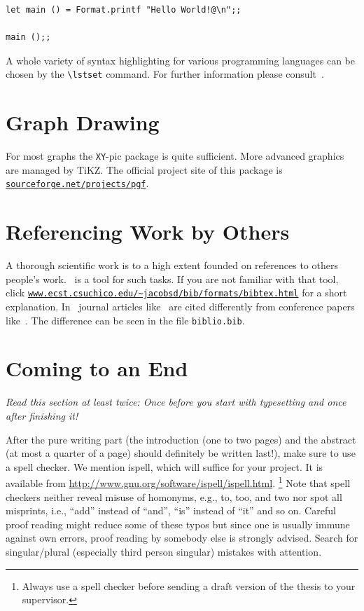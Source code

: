 \documentclass{howto}
\begin{document}
\lstset{label=LIS:hello world}
\begin{table}[tb]
\begin{lstlisting}
let main () = Format.printf "Hello World!@\n";;

main ();;
\end{lstlisting}
\end{table}
A whole variety of syntax highlighting for various programming languages
can be chosen by the \verb'\lstset' command. For further information please
consult~\cite{LIS}.

\section{Graph Drawing}
\label{GRA:main}
For most graphs the \texttt{XY}-pic package \cite{XY} is quite sufficient.
More advanced graphics are managed by TiKZ. The official project site of
this package is
\href{http://sourceforge.net/projects/pgf}%
 {\texttt{sourceforge.net/projects/pgf}}.

\section{Referencing Work by Others}
\label{REF:main}
A thorough scientific work is to a high extent founded on references to
others people's work. \BibTeX\ is a tool for such tasks. If
you are not familiar with that tool, click
\href{http://www.ecst.csuchico.edu/~jacobsd/bib/formats/bibtex.html}%
{\texttt{www.ecst.csuchico.edu/\textasciitilde jacobsd/bib/formats/bibtex.html}}
for a short explanation.
In \BibTeX\ journal articles like~\cite{HM-IC07} are cited differently from
conference papers like~\cite{HM-AISC04}. The difference can be seen in the
file \texttt{biblio.bib}.

\section{Coming to an End}
\label{COM:main}
\emph{Read this section at least twice: Once before you start with
typesetting and once after finishing it!}

After the pure writing part (the introduction (one to two pages) and the
abstract (at most a quarter of a page) should definitely be written last!),
make sure to use a spell checker.
We mention \textsf{ispell}, which will suffice for
your project. It is available from
\url{http://www.gnu.org/software/ispell/ispell.html}.%
\footnote{Always use a spell checker before sending a draft
version of the thesis to your supervisor.}
Note that spell checkers neither reveal misuse of homonyms, e.g.,
to, too, and two nor spot all misprints, i.e., ``add''
instead of ``and'', ``is'' instead of ``it'' and so on. Careful proof
reading might reduce some of these typos but since one is usually immune
against own errors, proof reading by somebody else is strongly advised.
Search for singular/plural (especially third person singular) mistakes
with attention.
\end{document}
